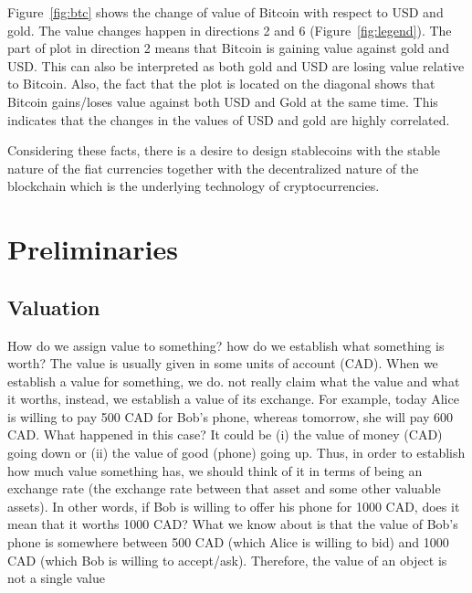 Figure~\ref{fig:btc} shows the change of value of Bitcoin with respect to USD and gold. The value changes happen in directions 2 and 6 (Figure~\ref{fig:legend}). The part of plot in direction 2 means that Bitcoin is gaining value against gold and USD. This can also be interpreted as both gold and USD are losing value relative to Bitcoin. %
Also, the fact that the plot is located on the diagonal shows that Bitcoin gains/loses value against both USD and Gold at the same time. This indicates that the changes in the values of USD and gold are highly correlated.

Considering these facts, there is a desire to design stablecoins with the stable nature of the fiat currencies together with the decentralized nature of the blockchain which is the underlying technology of cryptocurrencies.


\section{Preliminaries}

\subsection{Valuation}

How do we assign value to something? how do we establish what something is worth? 
The value is usually given in some units of account (\eg CAD). When we establish a value for something, we do. not really claim what the value and what it worths, instead, we establish a value of its exchange. For example, today Alice is willing to pay 500 CAD for Bob's phone, whereas tomorrow, she will pay 600 CAD. What happened in this case? It could be (i) the value of money (CAD) going down or (ii) the value of good (phone) going up. Thus, in order to establish how much value something has, we should think of it in terms of being an exchange rate (the exchange rate between that asset and some other valuable assets). In other words, if Bob is willing to offer his phone for 1000 CAD, does it mean that it worths 1000 CAD? What we know about is that the value of Bob's phone is somewhere between 500 CAD (which Alice is willing to bid) and 1000 CAD (which Bob is willing to accept/ask). Therefore, the value of an object is not a single value 

